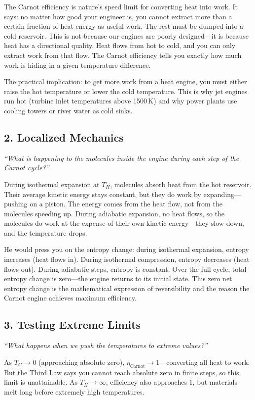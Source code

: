 \documentclass[11pt,openright]{book}
\begin{document}
The Carnot efficiency is nature's speed limit for converting heat into work. It says: no matter how good your engineer is, you cannot extract more than a certain fraction of heat energy as useful work. The rest must be dumped into a cold reservoir. This is not because our engines are poorly designed---it is because heat has a directional quality. Heat flows from hot to cold, and you can only extract work from that flow. The Carnot efficiency tells you exactly how much work is hiding in a given temperature difference.

The practical implication: to get more work from a heat engine, you must either raise the hot temperature or lower the cold temperature. This is why jet engines run hot (turbine inlet temperatures above 1500\,K) and why power plants use cooling towers or river water as cold sinks.

\subsection*{2. Localized Mechanics}
\textit{``What is happening to the molecules inside the engine during each step of the Carnot cycle?''}

During isothermal expansion at $T_H$, molecules absorb heat from the hot reservoir. Their average kinetic energy stays constant, but they do work by expanding---pushing on a piston. The energy comes from the heat flow, not from the molecules speeding up. During adiabatic expansion, no heat flows, so the molecules do work at the expense of their own kinetic energy---they slow down, and the temperature drops.

He would press you on the entropy change: during isothermal expansion, entropy increases (heat flows in). During isothermal compression, entropy decreases (heat flows out). During adiabatic steps, entropy is constant. Over the full cycle, total entropy change is zero---the engine returns to its initial state. This zero net entropy change is the mathematical expression of reversibility and the reason the Carnot engine achieves maximum efficiency.

\subsection*{3. Testing Extreme Limits}
\textit{``What happens when we push the temperatures to extreme values?''}

As $T_C \to 0$ (approaching absolute zero), $\eta_{\text{Carnot}} \to 1$---converting all heat to work. But the Third Law says you cannot reach absolute zero in finite steps, so this limit is unattainable. As $T_H \to \infty$, efficiency also approaches 1, but materials melt long before extremely high temperatures.
\end{document}

